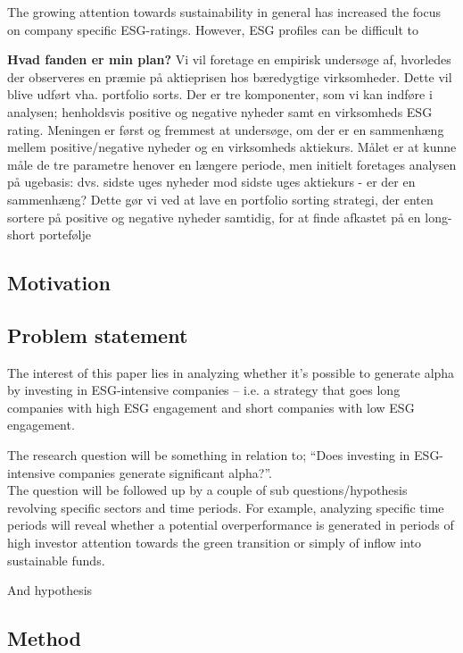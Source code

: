 The growing attention towards sustainability in general has increased the focus on company specific ESG-ratings. However, ESG profiles can be difficult to


\textbf{Hvad fanden er min plan?}
Vi vil foretage en empirisk undersøge af, hvorledes der observeres en præmie på aktieprisen hos bæredygtige virksomheder. Dette vil blive udført vha. portfolio sorts. Der er tre komponenter, som vi kan indføre i analysen; henholdsvis positive og negative nyheder samt en virksomheds ESG rating. Meningen er først og fremmest at undersøge, om der er en sammenhæng mellem positive/negative nyheder og en virksomheds aktiekurs. Målet er at kunne måle de tre parametre henover en længere periode, men initielt foretages analysen på ugebasis: dvs. sidste uges nyheder mod sidste uges aktiekurs -  er der en sammenhæng? Dette gør vi ved at lave en portfolio sorting strategi, der enten sortere på positive og negative nyheder samtidig, for at finde afkastet på en long-short portefølje 





\subsection{Motivation}

\subsection{Problem statement}

The interest of this paper lies in analyzing whether it’s possible to generate alpha by investing in ESG-intensive companies – i.e.
a strategy that goes long companies with high ESG engagement and short companies with low ESG engagement. 

The research question will be something in relation to; “Does investing in ESG-intensive companies generate significant alpha?”. \\

The question will be followed up by a couple of sub questions/hypothesis revolving specific sectors and time periods. For example, analyzing specific time periods will reveal whether a potential overperformance is generated in periods of high investor attention towards the green transition or simply of inflow into sustainable funds. 

And hypothesis
\subsection{Method}

